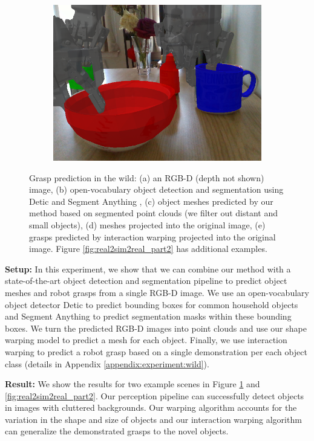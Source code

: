 \documentclass{article}
\begin{document}
\begin{figure}[]
\begin{subfigure}{(\linewidth - 0.05\linewidth)/5}
        \includegraphics[width=\linewidth]{figures/real2sim2real/5/4.png}
        \caption{}
    \end{subfigure}

    \caption{Grasp prediction in the wild: (a) an RGB-D (depth not shown) image, (b) open-vocabulary object detection and segmentation using Detic \cite{zhou22detecting} and Segment Anything \cite{kirillov23segment}, (c) object meshes predicted by our method based on segmented point clouds (we filter out distant and small objects), (d) meshes projected into the original image, (e) grasps predicted by interaction warping projected into the original image. Figure \ref{fig:real2sim2real_part2} has additional examples.}
    \label{fig:real2sim2real}
\end{figure}

\textbf{Setup:} In this experiment, we show that we can combine our method with a state-of-the-art object detection and segmentation pipeline to predict object meshes and robot grasps from a single RGB-D image. We use an open-vocabulary object detector Detic \cite{zhou22detecting} to predict bounding boxes for common household objects and Segment Anything \cite{kirillov23segment} to predict segmentation masks within these bounding boxes. We turn the predicted RGB-D images into point clouds and use our shape warping model to predict a mesh for each object. Finally, we use interaction warping to predict a robot grasp based on a single demonstration per each object class (details in Appendix \ref{appendix:experiment:wild}).

\textbf{Result:} We show the results for two example scenes in Figure \ref{fig:real2sim2real} and \ref{fig:real2sim2real_part2}. Our perception pipeline can successfully detect objects in images with cluttered backgrounds. Our warping algorithm accounts for the variation in the shape and size of objects and our interaction warping algorithm can generalize the demonstrated grasps to the novel objects.
\end{document}
